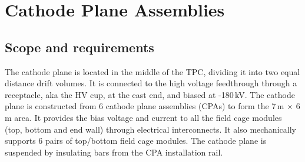 


\section{Cathode Plane Assemblies}


\subsection{Scope and requirements}

The cathode plane is located in the middle of the TPC, dividing it into two equal distance drift volumes.  It is connected to the high voltage feedthrough through a receptacle, aka the HV cup, at the east end, and biased at -180\,kV.  The cathode plane is constructed from 6 cathode plane assemblies (CPAs) to form the 7\,m $\times$ 6\,m area.  It provides the bias voltage and current to all the field cage modules (top, bottom and end wall) through electrical interconnects.  It also mechanically supports 6 pairs of top/bottom field cage modules.
The cathode plane is suspended by insulating bars from the CPA installation rail.


